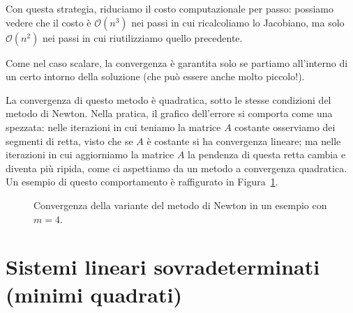 \documentclass[a4paper]{report}
\theoremstyle{definiton}
\theoremstyle{remark}
\newcommand{\x}{\mathbf{x}}
\begin{document}
Con questa strategia, riduciamo il costo computazionale per passo: possiamo vedere che il costo è $\mathcal{O}(n^3)$ nei passi in cui ricalcoliamo lo Jacobiano, ma solo $\mathcal{O}(n^2)$ nei passi in cui riutilizziamo quello precedente.

Come nel caso scalare, la convergenza è garantita solo se partiamo all'interno di un certo intorno della soluzione (che può essere anche molto piccolo!).

La convergenza di questo metodo è quadratica, sotto le stesse condizioni del metodo di Newton. Nella pratica, il grafico dell'errore si comporta come una spezzata: nelle iterazioni in cui teniamo la matrice $A$ costante osserviamo dei segmenti di retta, visto che se $A$ è costante si ha convergenza lineare; ma nelle iterazioni in cui aggiorniamo la matrice $A$ la pendenza di questa retta cambia e diventa più ripida, come ci aspettiamo da un metodo a convergenza quadratica. Un esempio di questo comportamento è raffigurato in Figura~\ref{fig:newtonibrido}.
\begin{figure}
    \begin{center}
        \end{center}
    \caption{Convergenza della variante del metodo di Newton in un esempio con $m=4$.} \label{fig:newtonibrido}
    \end{figure}    

\section{Sistemi lineari sovradeterminati (minimi quadrati)}
\end{document}
